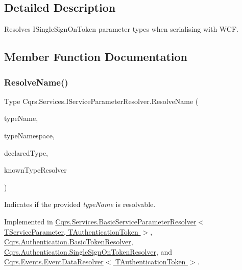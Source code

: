 \subsection{Detailed Description}
Resolves I\+Single\+Sign\+On\+Token parameter types when serialising with W\+CF. 



\subsection{Member Function Documentation}
\mbox{\label{interfaceCqrs_1_1Services_1_1IServiceParameterResolver_a37c4b53616192e4e2f15ab4661ab99ae_a37c4b53616192e4e2f15ab4661ab99ae}} 
\subsubsection{\texorpdfstring{Resolve\+Name()}{ResolveName()}}
{\footnotesize\ttfamily Type Cqrs.\+Services.\+I\+Service\+Parameter\+Resolver.\+Resolve\+Name (\begin{DoxyParamCaption}\item[{string}]{type\+Name,  }\item[{string}]{type\+Namespace,  }\item[{Type}]{declared\+Type,  }\item[{Data\+Contract\+Resolver}]{known\+Type\+Resolver }\end{DoxyParamCaption})}



Indicates if the provided {\itshape type\+Name}  is resolvable. 



Implemented in \hyperlink{classCqrs_1_1Services_1_1BasicServiceParameterResolver_a8c598f2f49a83190c315afc88e5630d5_a8c598f2f49a83190c315afc88e5630d5}{Cqrs.\+Services.\+Basic\+Service\+Parameter\+Resolver$<$ T\+Service\+Parameter, T\+Authentication\+Token $>$}, \hyperlink{classCqrs_1_1Authentication_1_1BasicTokenResolver_aeb429e2f8dca2c8e96682be8d7a590bb_aeb429e2f8dca2c8e96682be8d7a590bb}{Cqrs.\+Authentication.\+Basic\+Token\+Resolver}, \hyperlink{classCqrs_1_1Authentication_1_1SingleSignOnTokenResolver_abd546dcdabb00db2e8d0288cbe373895_abd546dcdabb00db2e8d0288cbe373895}{Cqrs.\+Authentication.\+Single\+Sign\+On\+Token\+Resolver}, and \hyperlink{classCqrs_1_1Events_1_1EventDataResolver_ade34415acd009dd3f9f3a43169da43e9_ade34415acd009dd3f9f3a43169da43e9}{Cqrs.\+Events.\+Event\+Data\+Resolver$<$ T\+Authentication\+Token $>$}.

